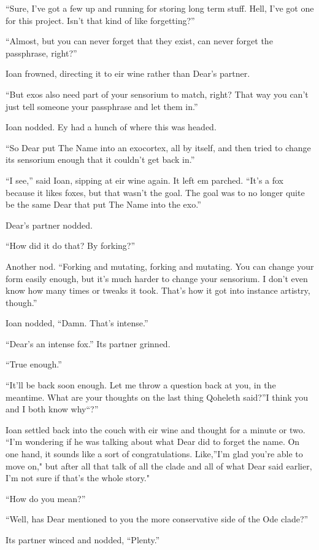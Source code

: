 ``Sure, I've got a few up and running for storing long term stuff. Hell, I've got one for this project. Isn't that kind of like forgetting?''

``Almost, but you can never forget that they exist, can never forget the passphrase, right?''

Ioan frowned, directing it to eir wine rather than Dear's partner.

``But exos also need part of your sensorium to match, right? That way you can't just tell someone your passphrase and let them in.''

Ioan nodded. Ey had a hunch of where this was headed.

``So Dear put The Name into an exocortex, all by itself, and then tried to change its sensorium enough that it couldn't get back in.''

``I see,'' said Ioan, sipping at eir wine again. It left em parched. ``It's a fox because it likes foxes, but that wasn't the goal. The goal was to no longer quite be the same Dear that put The Name into the exo.''

Dear's partner nodded.

``How did it do that? By forking?''

Another nod. ``Forking and mutating, forking and mutating. You can change your form easily enough, but it's much harder to change your sensorium. I don't even know how many times or tweaks it took. That's how it got into instance artistry, though.''

Ioan nodded, ``Damn. That's intense.''

``Dear's an intense fox.'' Its partner grinned.

``True enough.''

``It'll be back soon enough. Let me throw a question back at you, in the meantime. What are your thoughts on the last thing Qoheleth said?''I think you and I both know why``?''

Ioan settled back into the couch with eir wine and thought for a minute or two. ``I'm wondering if he was talking about what Dear did to forget the name. On one hand, it sounds like a sort of congratulations. Like,''I'm glad you're able to move on," but after all that talk of all the clade and all of what Dear said earlier, I'm not sure if that's the whole story."

``How do you mean?''

``Well, has Dear mentioned to you the more conservative side of the Ode clade?''

Its partner winced and nodded, ``Plenty.''


